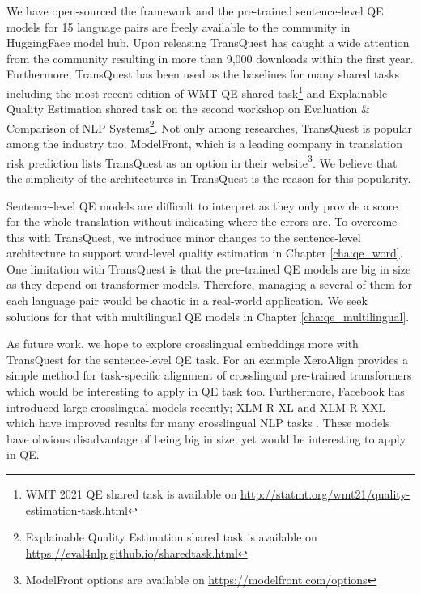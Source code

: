 We have open-sourced the framework and the pre-trained sentence-level QE models for 15 language pairs are freely available to the community in HuggingFace model hub. Upon releasing TransQuest has caught a wide attention from the community resulting in more than 9,000 downloads within the first year. Furthermore, TransQuest has been used as the baselines for many shared tasks including the most recent edition of WMT QE shared task\footnote{WMT 2021 QE shared task is available on \url{http://statmt.org/wmt21/quality-estimation-task.html}} and Explainable Quality Estimation shared task on the second workshop on Evaluation \& Comparison of NLP Systems\footnote{Explainable Quality Estimation shared task is available on \url{https://eval4nlp.github.io/sharedtask.html}}. Not only among researches, TransQuest is popular among the industry too. ModelFront, which is a leading company in translation risk prediction lists TransQuest as an option in their website\footnote{ModelFront options are available on \url{https://modelfront.com/options}}. We believe that the simplicity of the architectures in TransQuest is the reason for this popularity. 

Sentence-level QE models are difficult to interpret as they only provide a score for the whole translation without indicating where the errors are. To overcome this with TransQuest, we introduce minor changes to the sentence-level architecture to support word-level quality estimation in Chapter \ref{cha:qe_word}. One limitation with TransQuest is that the pre-trained QE models are big in size as they depend on transformer models. Therefore, managing a several of them for each language pair would be chaotic in a real-world application. We seek solutions for that with multilingual QE models in Chapter \ref{cha:qe_multilingual}. 

As future work, we hope to explore crosslingual embeddings more with TransQuest for the sentence-level QE task. For an example XeroAlign \cite{gritta-iacobacci-2021-xeroalign} provides a simple method for task-specific alignment of crosslingual pre-trained transformers which would be interesting to apply in QE task too. Furthermore, Facebook has introduced large crosslingual models recently; XLM-R XL and XLM-R XXL which have improved results for many crosslingual NLP tasks \cite{goyal2021}. These models have obvious disadvantage of being big in size; yet would be interesting to apply in QE. 









